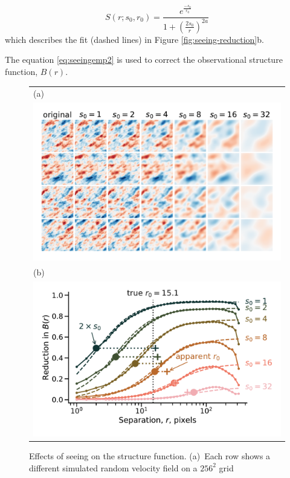 \documentclass[fleqn,usenatbib, useAMS, a4paper]{mnras}
\begin{document}
\begin{equation}\label{eq:seeingemp2}
S(r; s_0, r_0) = \frac{e^\frac{-s_0}{r_0}}{1+(\frac{2s_0}{r})^{2a}}
\end{equation}
%
which describes the fit (dashed lines) in Figure \ref{fig:seeing-reduction}b. 

The equation \ref{eq:seeingemp2} is used to correct the observational structure function, \(B(r)\). 

\begin{figure}
  \begin{tabular}{@{} l @{}}
    (a)\\
    \includegraphics[width=\linewidth]{Figures/fake-seeing-nonp-thumbnails}\\
    (b)\\
    \includegraphics[width=\linewidth]{Figures/fake-seeing-nonp-reduction}
  \end{tabular}
  \caption{Effects of seeing on the structure function.
    (a)~Each row shows a different simulated random velocity field on a \(256^2\) grid
}
\end{figure}
\end{document}

